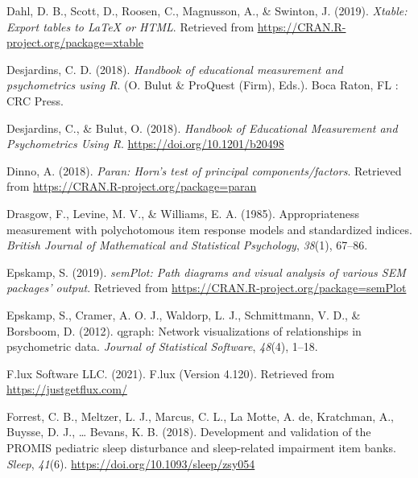 \documentclass[
  english,
  man]{apa6}
\newlength{\cslhangindent}
\newlength{\cslentryspacingunit} %
\newenvironment{CSLReferences}[2] %
 {%
  \setlength{\parindent}{0pt}
  \ifodd #1
  \let\oldpar\par
  \def\par{\hangindent=\cslhangindent\oldpar}
  \fi
  \setlength{\parskip}{#2\cslentryspacingunit}
 }%
 {}
\begin{document}
\begin{CSLReferences}{1}{0}
\leavevmode{}%
Dahl, D. B., Scott, D., Roosen, C., Magnusson, A., \& Swinton, J. (2019). \emph{Xtable: Export tables to LaTeX or HTML}. Retrieved from \url{https://CRAN.R-project.org/package=xtable}

\leavevmode{}%
Desjardins, C. D. (2018). \emph{Handbook of educational measurement and psychometrics using {R}}. (O. Bulut \& ProQuest (Firm), Eds.). {Boca Raton, FL : CRC Press}.

\leavevmode{}%
Desjardins, C., \& Bulut, O. (2018). \emph{Handbook of {Educational Measurement} and {Psychometrics Using R}}. \url{https://doi.org/10.1201/b20498}

\leavevmode{}%
Dinno, A. (2018). \emph{Paran: Horn's test of principal components/factors}. Retrieved from \url{https://CRAN.R-project.org/package=paran}

\leavevmode{}%
Drasgow, F., Levine, M. V., \& Williams, E. A. (1985). Appropriateness measurement with polychotomous item response models and standardized indices. \emph{British Journal of Mathematical and Statistical Psychology}, \emph{38}(1), 67--86.

\leavevmode{}%
Epskamp, S. (2019). \emph{semPlot: Path diagrams and visual analysis of various SEM packages' output}. Retrieved from \url{https://CRAN.R-project.org/package=semPlot}

\leavevmode{}%
Epskamp, S., Cramer, A. O. J., Waldorp, L. J., Schmittmann, V. D., \& Borsboom, D. (2012). {qgraph}: Network visualizations of relationships in psychometric data. \emph{Journal of Statistical Software}, \emph{48}(4), 1--18.

\leavevmode{}%
F.lux Software LLC. (2021). F.lux (Version 4.120). Retrieved from \url{https://justgetflux.com/}

\leavevmode{}%
Forrest, C. B., Meltzer, L. J., Marcus, C. L., La Motte, A. de, Kratchman, A., Buysse, D. J., \ldots{} Bevans, K. B. (2018). Development and validation of the PROMIS pediatric sleep disturbance and sleep-related impairment item banks. \emph{Sleep}, \emph{41}(6). \url{https://doi.org/10.1093/sleep/zsy054}


\end{CSLReferences}
\end{document}
